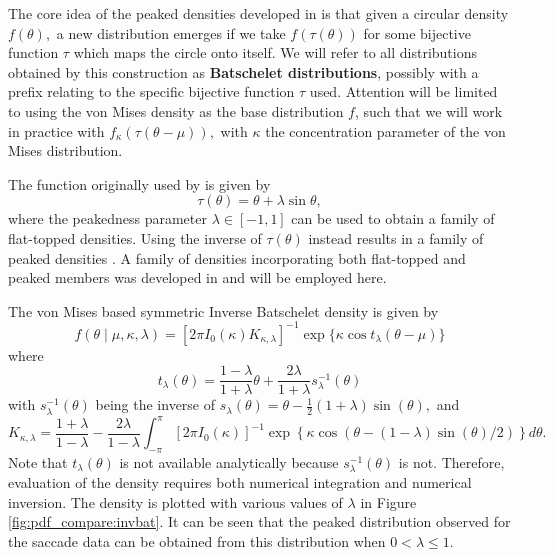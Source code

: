 The core idea of the peaked densities developed in \citet{batschelet1981circular} is that given a circular density \(f (\theta), \) a new distribution emerges if we take \(f (\tau(\theta)) \) for some bijective function \( \tau \) which maps the circle onto itself. We will refer to all distributions obtained by this construction as \textbf{Batschelet distributions}, possibly with a prefix relating to the specific bijective function  \(\tau\) used. Attention will be limited to using the von Mises density as the base distribution \(f\), such that we will work in practice with \(f_\kappa (\tau(\theta - \mu)), \) with \( \kappa \) the concentration parameter of the von Mises distribution.

The function originally used by \citet{batschelet1981circular} is given by
\begin{equation}
  \tau(\theta) = \theta + \lambda \sin \theta,
\end{equation}
where the peakedness parameter \( \lambda \in [-1, 1] \) can be used to obtain a family of flat-topped densities. Using the inverse of \(\tau(\theta)\) instead results in a family of peaked densities \citep{abe2010symmetric, pewsey2011extension}. A family of densities incorporating both flat-topped and peaked members was developed in \citet{jones2012inverse} and will be employed here.

The von Mises based symmetric Inverse Batschelet density is given by
\begin{equation} \label{eqn:invbatpdf}
 f(\theta \mid \mu, \kappa, \lambda) = [2\pi I_0(\kappa)K_{\kappa, \lambda}]^{-1} \exp\{\kappa \cos t_\lambda(\theta - \mu)\}
\end{equation}
where
\begin{equation} \label{eqn:invbattransform}
  t_\lambda(\theta) = \frac{1 - \lambda}{1 + \lambda}\theta + \frac{2\lambda}{1 + \lambda} s_\lambda^{-1}(\theta)
\end{equation}
with \(s_\lambda^{-1}(\theta)\) being the inverse of \(s_\lambda(\theta) = \theta - \frac{1}{2} (1 + \lambda) \sin(\theta),\) and
\begin{equation}
   K_{\kappa, \lambda} = \frac{1 + \lambda}{1 - \lambda} - \frac{2\lambda}{1 - \lambda} \int_{-\pi}^\pi [2\pi I_0(\kappa)]^{-1} \exp\left\{\kappa \cos \left(\theta -  (1 - \lambda) \sin(\theta) / 2 \right) \right\} d\theta.
\end{equation}
Note that \(t_\lambda(\theta)\) is not available analytically because \(s_\lambda^{-1}(\theta)\) is not.  Therefore, evaluation of the density requires both numerical integration and numerical inversion. The density is plotted with various values of \(\lambda\) in Figure \ref{fig:pdf_compare:invbat}. It can be seen that the peaked distribution observed for the saccade data can be obtained from this distribution when \(0 < \lambda \leq 1.\)

